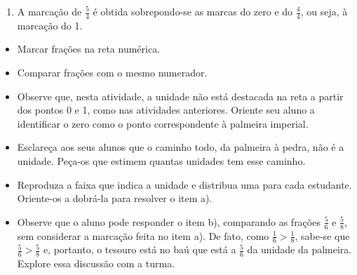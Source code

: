 \begin{multicols}{2}
\begin{solucao}{}{}
\begin{enumerate} [\quad a)]
    \item A marcação de $\frac{5}{4}$ é obtida sobrepondo-se as marcas do zero e do $\frac{4}{4}$, ou seja, à marcação do 1.

\begin{center}
\end{center}
\end{enumerate} %
\end{solucao}
\end{multicols}
\clearpage

\begin{objetivos}[label=chap3-ativ7]{}{}

\begin{itemize} %
\item Marcar frações na reta numérica.
\item Comparar frações com o mesmo numerador.
\end{itemize} %
\end{objetivos}

\begin{orientacoes}{}{}
\begin{itemize} %
    \item Observe que, nesta atividade, a unidade não está destacada na reta a partir dos pontos 0 e 1, como nas atividades anteriores. Oriente seu aluno a identificar o zero como o ponto correspondente à palmeira imperial.
    \item Esclareça aos seus alunos que o caminho todo, da palmeira à pedra, não é a unidade. Peça-os que estimem quantas unidades tem esse caminho.
    \item Reproduza a faixa que indica a unidade e distribua uma para cada estudante. Oriente-os a dobrá-la para resolver o item a).
    \item Observe que o aluno pode responder o item b), comparando as frações $\frac{5}{6}$ e $\frac{5}{8}$, sem considerar a marcação feita no item a). De fato, como $\frac{1}{6} > \frac{1}{8}$, sabe-se que $\frac{5}{6} > \frac{5}{8}$ e, portanto, o tesouro está no baú que está a $\frac{5}{6}$ da unidade da palmeira.
Explore essa discussão com a turma.

\end{itemize} %
\end{orientacoes}


